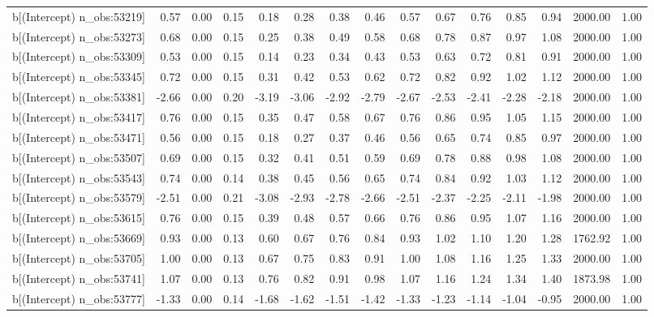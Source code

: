 \begin{table}[ht]
\begin{tabular}{rrrrrrrrrrrrrrr}
  b[(Intercept) n\_obs:53219] & 0.57 & 0.00 & 0.15 & 0.18 & 0.28 & 0.38 & 0.46 & 0.57 & 0.67 & 0.76 & 0.85 & 0.94 & 2000.00 & 1.00 \\ 
  b[(Intercept) n\_obs:53273] & 0.68 & 0.00 & 0.15 & 0.25 & 0.38 & 0.49 & 0.58 & 0.68 & 0.78 & 0.87 & 0.97 & 1.08 & 2000.00 & 1.00 \\ 
  b[(Intercept) n\_obs:53309] & 0.53 & 0.00 & 0.15 & 0.14 & 0.23 & 0.34 & 0.43 & 0.53 & 0.63 & 0.72 & 0.81 & 0.91 & 2000.00 & 1.00 \\ 
  b[(Intercept) n\_obs:53345] & 0.72 & 0.00 & 0.15 & 0.31 & 0.42 & 0.53 & 0.62 & 0.72 & 0.82 & 0.92 & 1.02 & 1.12 & 2000.00 & 1.00 \\ 
  b[(Intercept) n\_obs:53381] & -2.66 & 0.00 & 0.20 & -3.19 & -3.06 & -2.92 & -2.79 & -2.67 & -2.53 & -2.41 & -2.28 & -2.18 & 2000.00 & 1.00 \\ 
  b[(Intercept) n\_obs:53417] & 0.76 & 0.00 & 0.15 & 0.35 & 0.47 & 0.58 & 0.67 & 0.76 & 0.86 & 0.95 & 1.05 & 1.15 & 2000.00 & 1.00 \\ 
  b[(Intercept) n\_obs:53471] & 0.56 & 0.00 & 0.15 & 0.18 & 0.27 & 0.37 & 0.46 & 0.56 & 0.65 & 0.74 & 0.85 & 0.97 & 2000.00 & 1.00 \\ 
  b[(Intercept) n\_obs:53507] & 0.69 & 0.00 & 0.15 & 0.32 & 0.41 & 0.51 & 0.59 & 0.69 & 0.78 & 0.88 & 0.98 & 1.08 & 2000.00 & 1.00 \\ 
  b[(Intercept) n\_obs:53543] & 0.74 & 0.00 & 0.14 & 0.38 & 0.45 & 0.56 & 0.65 & 0.74 & 0.84 & 0.92 & 1.03 & 1.12 & 2000.00 & 1.00 \\ 
  b[(Intercept) n\_obs:53579] & -2.51 & 0.00 & 0.21 & -3.08 & -2.93 & -2.78 & -2.66 & -2.51 & -2.37 & -2.25 & -2.11 & -1.98 & 2000.00 & 1.00 \\ 
  b[(Intercept) n\_obs:53615] & 0.76 & 0.00 & 0.15 & 0.39 & 0.48 & 0.57 & 0.66 & 0.76 & 0.86 & 0.95 & 1.07 & 1.16 & 2000.00 & 1.00 \\ 
  b[(Intercept) n\_obs:53669] & 0.93 & 0.00 & 0.13 & 0.60 & 0.67 & 0.76 & 0.84 & 0.93 & 1.02 & 1.10 & 1.20 & 1.28 & 1762.92 & 1.00 \\ 
  b[(Intercept) n\_obs:53705] & 1.00 & 0.00 & 0.13 & 0.67 & 0.75 & 0.83 & 0.91 & 1.00 & 1.08 & 1.16 & 1.25 & 1.33 & 2000.00 & 1.00 \\ 
  b[(Intercept) n\_obs:53741] & 1.07 & 0.00 & 0.13 & 0.76 & 0.82 & 0.91 & 0.98 & 1.07 & 1.16 & 1.24 & 1.34 & 1.40 & 1873.98 & 1.00 \\ 
  b[(Intercept) n\_obs:53777] & -1.33 & 0.00 & 0.14 & -1.68 & -1.62 & -1.51 & -1.42 & -1.33 & -1.23 & -1.14 & -1.04 & -0.95 & 2000.00 & 1.00 \\ 

\end{tabular}
\end{table}
